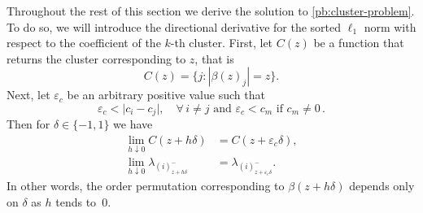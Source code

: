 Throughout the rest of this section we derive the solution to \eqref{pb:cluster-problem}.
To do so, we will introduce the directional derivative for the
sorted \(\ell_1\) norm with respect to the coefficient of the \(k\)-th cluster.
First, let \(C(z)\) be a function that returns the cluster corresponding to \(z\), that is
\[
  C(z) = \{j : |\beta(z)_j| = z\}.
\]
Next, let $\varepsilon_c$ be an arbitrary positive value such that
\begin{equation}
  \label{eq:epsilon-c}
  \varepsilon_c < \big| c_i - c_j\big| , \quad \forall\, i \neq j \text{ and } \varepsilon_c < c_m \text{ if } c_m \neq 0 \, .
\end{equation}
Then for \(\delta \in \{-1, 1\}\) we have
\begin{equation}
  \begin{aligned}
    \lim_{h \downarrow 0} C(z + h\delta)                & = C(z + {\varepsilon_c} \delta),               \\
    \lim_{h \downarrow 0} \lambda_{(i)^-_{z + h\delta}} & = \lambda_{(i)^-_{z + {\varepsilon_c}\delta}}.
  \end{aligned}
\end{equation}
In other words, the order permutation corresponding to \(\beta(z + h\delta)\)
depends only on \(\delta\) as \(h\) tends to~\(0\).
